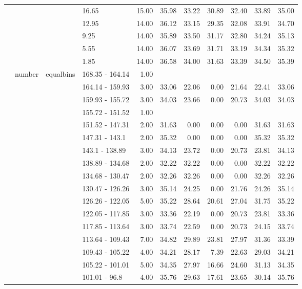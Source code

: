 \begin{longtable}{llllrrrrrrr}
   &  &  & 16.65 & 15.00 & 35.98 & 33.22 & 30.89 & 32.40 & 33.89 & 35.00 \\ 
   &  &  & 12.95 & 14.00 & 36.12 & 33.15 & 29.35 & 32.08 & 33.91 & 34.70 \\ 
   &  &  & 9.25 & 14.00 & 35.89 & 33.50 & 31.17 & 32.80 & 34.24 & 35.13 \\ 
   &  &  & 5.55 & 14.00 & 36.07 & 33.69 & 31.71 & 33.19 & 34.34 & 35.32 \\ 
   &  &  & 1.85 & 14.00 & 36.58 & 34.00 & 31.63 & 33.39 & 34.50 & 35.39 \\ 
   & number & equalbins & 168.35 - 164.14 & 1.00 &  &  &  &  &  &  \\ 
   &  &  & 164.14 - 159.93 & 3.00 & 33.06 & 22.06 & 0.00 & 21.64 & 22.41 & 33.06 \\ 
   &  &  & 159.93 - 155.72 & 3.00 & 34.03 & 23.66 & 0.00 & 20.73 & 34.03 & 34.03 \\ 
   &  &  & 155.72 - 151.52 & 1.00 &  &  &  &  &  &  \\ 
   &  &  & 151.52 - 147.31 & 2.00 & 31.63 & 0.00 & 0.00 & 0.00 & 31.63 & 31.63 \\ 
   &  &  & 147.31 - 143.1 & 2.00 & 35.32 & 0.00 & 0.00 & 0.00 & 35.32 & 35.32 \\ 
   &  &  & 143.1 - 138.89 & 3.00 & 34.13 & 23.72 & 0.00 & 20.73 & 23.81 & 34.13 \\ 
   &  &  & 138.89 - 134.68 & 2.00 & 32.22 & 32.22 & 0.00 & 0.00 & 32.22 & 32.22 \\ 
   &  &  & 134.68 - 130.47 & 2.00 & 32.26 & 32.26 & 0.00 & 0.00 & 32.26 & 32.26 \\ 
   &  &  & 130.47 - 126.26 & 3.00 & 35.14 & 24.25 & 0.00 & 21.76 & 24.26 & 35.14 \\ 
   &  &  & 126.26 - 122.05 & 5.00 & 35.22 & 28.64 & 20.61 & 27.04 & 31.75 & 35.22 \\ 
   &  &  & 122.05 - 117.85 & 3.00 & 33.36 & 22.19 & 0.00 & 20.73 & 23.81 & 33.36 \\ 
   &  &  & 117.85 - 113.64 & 3.00 & 33.74 & 22.59 & 0.00 & 20.73 & 24.15 & 33.74 \\ 
   &  &  & 113.64 - 109.43 & 7.00 & 34.82 & 29.89 & 23.81 & 27.97 & 31.36 & 33.39 \\ 
   &  &  & 109.43 - 105.22 & 4.00 & 34.21 & 28.17 & 7.39 & 22.63 & 29.03 & 34.21 \\ 
   &  &  & 105.22 - 101.01 & 5.00 & 34.35 & 27.97 & 16.66 & 24.60 & 31.13 & 34.35 \\ 
   &  &  & 101.01 - 96.8 & 4.00 & 35.76 & 29.63 & 17.61 & 23.65 & 30.14 & 35.76 \\ 

\end{longtable}
